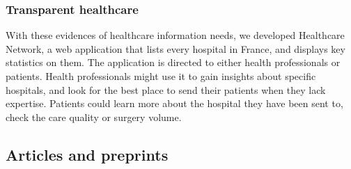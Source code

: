 \subsubsection{Transparent healthcare}
With these evidences of healthcare information needs, we developed Healthcare
Network, a web application that lists every hospital in France, and displays key
statistics on them. The application is directed to either health professionals
or patients. Health professionals might use it to gain insights about specific
hospitals, and look for the best place to send their patients when they lack
expertise. Patients could learn more about the hospital they have been sent to,
check the care quality or surgery volume.

\subsection{Articles and preprints}
